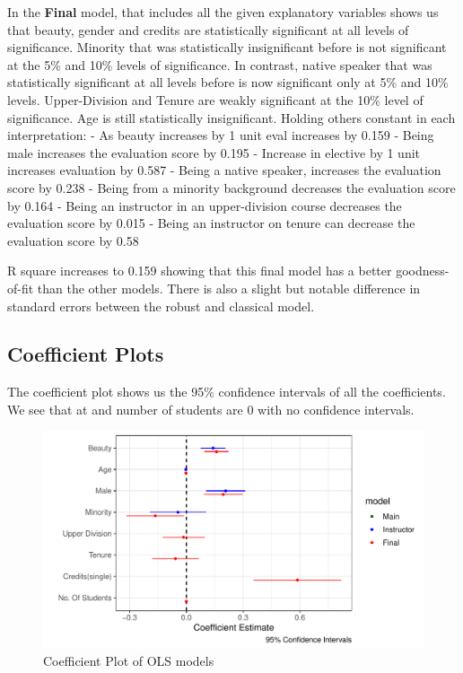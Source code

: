 \documentclass[
  12 pt,
]{article}
\begin{document}
In the \textbf{Final} model, that includes all the given explanatory variables shows us that beauty, gender and credits are statistically significant at all levels of significance. Minority that was statistically insignificant before is not significant at the 5\% and 10\% levels of significance. In contrast, native speaker that was statistically significant at all levels before is now significant only at 5\% and 10\% levels. Upper-Division and Tenure are weakly significant at the 10\% level of significance. Age is still statistically insignificant. Holding others constant in each interpretation:
- As beauty increases by 1 unit eval increases by 0.159
- Being male increases the evaluation score by 0.195
- Increase in elective by 1 unit increases evaluation by 0.587
- Being a native speaker, increases the evaluation score by 0.238
- Being from a minority background decreases the evaluation score by 0.164
- Being an instructor in an upper-division course decreases the evaluation score by 0.015
- Being an instructor on tenure can decrease the evaluation score by 0.58

R square increases to 0.159 showing that this final model has a better goodness-of-fit than the other models. There is also a slight but notable difference in standard errors between the robust and classical model.

\hypertarget{coefficient-plots}{%
\subsection{Coefficient Plots}\label{coefficient-plots}}

The coefficient plot shows us the 95\% confidence intervals of all the coefficients. We see that at and number of students are 0 with no confidence intervals.

\begin{figure}[H]

{\centering \includegraphics{18205420_Markdown--1-_files/figure-latex/coefplot-1} 

}

\caption{Coefficient Plot of OLS models}\label{fig:coefplot}
\end{figure}
\newpage
\end{document}
